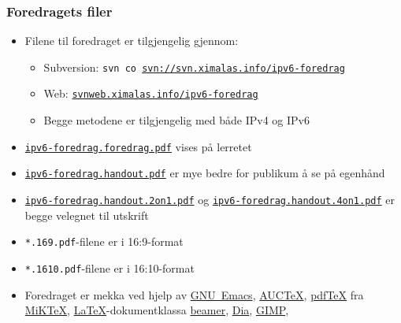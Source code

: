 \makeatletter
{}
\makeatother

\begin{frame}
  \titlepage
\end{frame}

\begin{frame}[allowframebreaks]
  \frametitle{Foredragets filer}
  \begin{itemize}
  \item Filene til foredraget er tilgjengelig gjennom:
    \begin{itemize}
    \item Subversion: \texttt{svn co
        \url{svn://svn.ximalas.info/ipv6-foredrag}}
    \item Web:
      \href{http://svnweb.ximalas.info/ipv6-foredrag/}{\texttt{svnweb.ximalas.info/ipv6-foredrag}}
    \item Begge metodene er tilgjengelig med både IPv4 og \alert{IPv6}
    \end{itemize}
  \item
    \href{http://svnweb.ximalas.info/ipv6-foredrag/trunk/ipv6-foredrag.foredrag.pdf?view=co}{\texttt{ipv6-foredrag.foredrag.pdf}}
    vises på lerretet
  \item
    \href{http://svnweb.ximalas.info/ipv6-foredrag/trunk/ipv6-foredrag.handout.pdf?view=co}{\texttt{ipv6-foredrag.handout.pdf}}
    er mye bedre for publikum å se på egenhånd
  \item
    \href{http://svnweb.ximalas.info/ipv6-foredrag/trunk/ipv6-foredrag.handout.2on1.pdf?view=co}{\texttt{ipv6-foredrag.handout.2on1.pdf}}
    og
    \href{http://svnweb.ximalas.info/ipv6-foredrag/trunk/ipv6-foredrag.handout.4on1.pdf?view=co}{\texttt{ipv6-foredrag.handout.4on1.pdf}}
    er begge velegnet til utskrift
  \item \texttt{*.169.pdf}-filene er i 16:9-format
  \item \texttt{*.1610.pdf}-filene er i 16:10-format
  \framebreak
  \item Foredraget er mekka ved hjelp av
    \href{http://www.gnu.org/software/emacs/}{GNU~Emacs},
    \href{http://www.gnu.org/software/auctex/}{AUC\TeX},
    \href{http://www.tug.org/applications/pdftex/}{pdf\TeX} fra
    \href{http://miktex.org/}{MiK\TeX},
    \href{http://www.latex-project.org/}{\LaTeX}-dokumentklassa
    \href{https://bitbucket.org/rivanvx/beamer/wiki/Home}{beamer},
    \href{https://wiki.gnome.org/Apps/Dia/}{Dia},
    \href{http://www.gimp.org/}{GIMP},

\end{itemize}
\end{frame}
